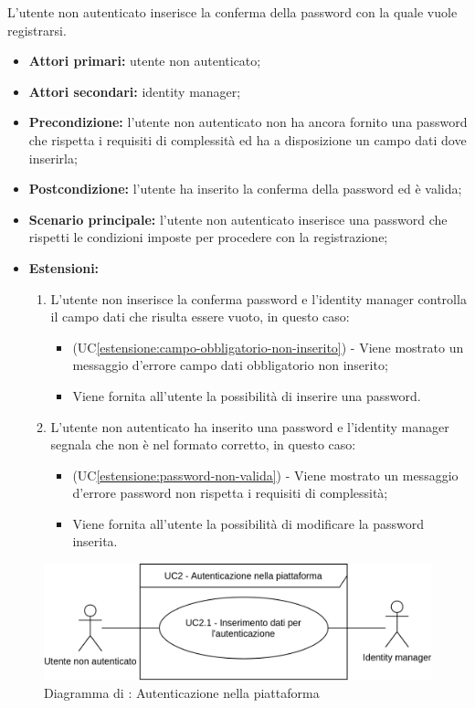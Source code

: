 L'utente non autenticato inserisce la conferma della password con la quale vuole registrarsi.
\begin{itemize}
	\item \textbf{Attori primari:} utente non autenticato;
	\item \textbf{Attori secondari:} identity manager;
	\item \textbf{Precondizione:} l'utente non autenticato non ha ancora fornito una password che rispetta i requisiti di complessità ed ha a disposizione un campo dati dove inserirla;
	\item \textbf{Postcondizione:} l'utente ha inserito la conferma della password ed è valida;
	\item \textbf{Scenario principale:} l'utente non autenticato inserisce una password che rispetti le condizioni imposte per procedere con la registrazione;
	\item \textbf{Estensioni:} 
	\begin{enumerate}[label=\lett]
		\item L'utente non inserisce la conferma password e l'identity manager controlla il campo dati che risulta essere vuoto, in questo caso:
		\begin{itemize}
			\item (UC\ref{estensione:campo-obbligatorio-non-inserito}) - Viene mostrato un messaggio d'errore campo dati obbligatorio non inserito;
			\item Viene fornita all'utente la possibilità di inserire una password.
		\end{itemize}
		\item L'utente non autenticato ha inserito una password e l'identity manager segnala che non è nel formato corretto, in questo caso:
		\begin{itemize}
			\item (UC\ref{estensione:password-non-valida}) - Viene mostrato un messaggio d'errore password non rispetta i requisiti di complessità;
			\item Viene fornita all'utente la possibilità di modificare la password inserita.
		\end{itemize}
	\end{enumerate} 
\end{itemize}

\label{autenticazione-piattaforma}

\begin{figure}[H]
    \centering
    \includegraphics[scale=1]{Immagini/DiagrammiUC/AccessoAllaPiattaforma/AutenticazionePiattaforma.png}
    \caption{Diagramma di \actualUC: Autenticazione nella piattaforma} 
    \label{fig:autenticazione-piattaforma}
\end{figure}

